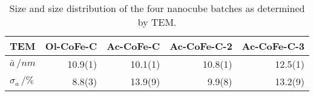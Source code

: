 \documentclass[\main/dresen_thesis.tex]{subfiles}
\begin{document}
  \begin{table}[ht]
    \centering
    \caption{\label{tab:monolayers:nanoparticles:discussion:tem}Size and size distribution of the four nanocube batches as determined by TEM.}
    \begin{tabular}{ l | r | r | r | r}
      \textbf{TEM} & \textbf{Ol-CoFe-C} & \textbf{Ac-CoFe-C} & \textbf{Ac-CoFe-C-2} & \textbf{Ac-CoFe-C-3}\\
      \hline
      $\bar{a} \, / \unit{nm}$    & 10.9(1) & 10.1(1) & 10.8(1) & 12.5(1)\\
      $\sigma_{a}\, / \unit{\%}$  & 8.8(3)  & 13.9(9) & 9.9(8)  & 13.2(9) \\
      \hline
    \end{tabular}
  \end{table}
\end{document}
